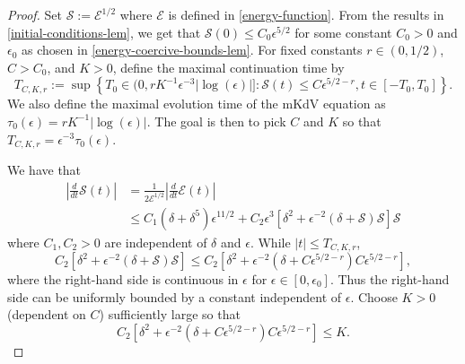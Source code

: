 \begin{proof}
	
	Set \(\mathcal S := \mathcal E ^{1/2}\) where \(\mathcal E\) is defined in \cref{energy-function}. From the results in \cref{initial-conditions-lem}, we get that \(\mathcal S(0) \leq C_0 \epsilon^{5/2}\) for some constant \(C_0 > 0\) and \(\epsilon_0\) as chosen in \cref{energy-coercive-bounds-lem}. For fixed constants \(r\in(0,1/2)\), \(C> C_0\), and \(K > 0\), define the maximal continuation time by 
	\begin{equation*}
		T_{C,K,r} := \sup \left\{T_0 \in (0, r K^{-1} \epsilon^{-3} |\log(\epsilon)|]: \mathcal S(t) \leq C \epsilon^{5/2 -r}, t\in [-T_0, T_0]\right\}.
	\end{equation*} 
	We also define the maximal evolution time of the mKdV equation as \(\tau_0(\epsilon) = rK^{-1}|\log(\epsilon)|\). The goal is then to pick \(C\) and \(K\) so that \(T_{C,K,r} = \epsilon^{-3} \tau_0(\epsilon)\).
	
	We have that
	\begin{equation*}
	\begin{aligned}
		\left | \frac d {dt} \mathcal S(t) \right | &= \frac 1 {2 \mathcal E ^{1/2}} \left | \frac d {dt} \mathcal E(t) \right| \\
		&\leq C_1(\delta + \delta^5) \epsilon^{11/2} + C_2 \epsilon^3\left[ \delta^2 + \epsilon^{-2}(\delta + \mathcal S) \mathcal S \right]\mathcal S
	\end{aligned}
	\end{equation*}
	where \(C_1, C_2 > 0\) are independent of \(\delta\) and \(\epsilon\). While \(|t| \leq T_{C,K,r}\),
	\begin{equation*}
		C_2 \left[ \delta^2 + \epsilon^{-2}(\delta + \mathcal S) \mathcal S \right] \leq C_2 \left[ \delta^2  + \epsilon^{-2}(\delta +  C\epsilon^{5/2-r}) C \epsilon^{5/2-r} \right],
	\end{equation*}
	where the right-hand side is continuous in \(\epsilon \) for \(\epsilon \in [0,\epsilon_0]\). Thus the right-hand side can be uniformly bounded by a constant independent of \(\epsilon\). Choose \(K>0\) (dependent on \(C\)) sufficiently large so that 
	\begin{equation}\label{K-def}
		C_2 \left[ \delta^2  + \epsilon^{-2}(\delta +  C\epsilon^{5/2-r}) C \epsilon^{5/2-r} \right] \leq K.
	\end{equation}


\end{proof}

